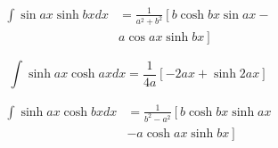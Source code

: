 \documentclass[11pt,twoside]{article}
\begin{document}
\begin{multicols}{3}
\begin{footnotesize}
\begin{align}
\int \sin ax \sinh bx dx &= 
\frac{1}{a^2 + b^2} \left[
b \cosh bx \sin ax -
\right . \nonumber \\ & \left .
 a \cos ax \sinh bx
\right] 
\end{align}

\begin{equation}
\int \sinh ax \cosh ax dx= 
\frac{1}{4a}\left[ 
-2ax + \sinh 2ax \right]
\end{equation}

\begin{align}
\int \sinh ax \cosh bx dx&= 
\frac{1}{b^2-a^2}\left[ 
b \cosh bx \sinh ax 
\right . \nonumber \\ & \left .
- a \cosh ax \sinh bx \right]
\end{align}


\end{footnotesize}
\end{multicols}
\end{document}
